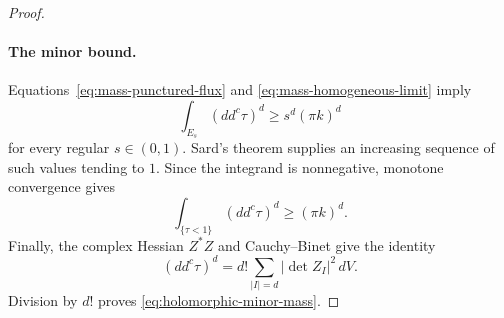 \begin{proof}
\paragraph{The minor bound.}
Equations~\eqref{eq:mass-punctured-flux} and
\eqref{eq:mass-homogeneous-limit} imply
\[
\int_{E_s}(dd^c\tau)^d\geq s^d(\pi k)^d
\]
for every regular $s\in(0,1)$. Sard's theorem supplies an increasing
sequence of such values tending to $1$. Since the integrand is
nonnegative, monotone convergence gives
\[
\int_{\{\tau<1\}}(dd^c\tau)^d\geq(\pi k)^d.
\]
Finally, the complex Hessian $Z^*Z$ and Cauchy--Binet give the identity
\[
(dd^c\tau)^d
 =d!\sum_{|I|=d}|\det Z_I|^2\,dV.
\]
Division by $d!$ proves \eqref{eq:holomorphic-minor-mass}.
\end{proof}

